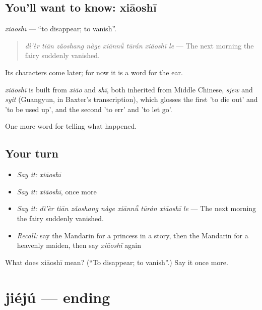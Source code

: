 \subsection*{You'll want to know: xiāoshī}
\emph{xiāoshī} — \textquotedblleft{}to disappear; to vanish\textquotedblright{}.

\begin{quote}
\emph{dì'èr tiān zǎoshang nàge xiānnǚ tūrán xiāoshī le} — The next morning the fairy suddenly vanished.
\end{quote}

Its characters come later; for now it is a word for the ear.

\begin{cousinweb}
\emph{xiāoshī} is built from \emph{xiāo} and \emph{shī}, both inherited from Middle Chinese, \emph{sjew} and \emph{syit} (Guangyun, in Baxter's transcription), which glosses the first 'to die out' and 'to be used up', and the second 'to err' and 'to let go'.
\end{cousinweb}

\begin{grammarlens}[title={What you've built}]
One more word for telling what happened.
\end{grammarlens}

\subsection*{Your turn}
\begin{itemize}
\raggedright
  \item \emph{Say it:} \emph{xiāoshī}
  \item \emph{Say it:} \emph{xiāoshī}, once more
  \item \emph{Say it:} \emph{dì'èr tiān zǎoshang nàge xiānnǚ tūrán xiāoshī le} — The next morning the fairy suddenly vanished.
  \item \emph{Recall:} say the Mandarin for a princess in a story, then the Mandarin for a heavenly maiden, then say \emph{xiāoshī} again
\end{itemize}

\begin{tcolorbox}[breakable,colback=teal!4,colframe=teal!35!black,title={Before you move on}]
What does xiāoshī mean? (\textquotedblleft{}To disappear; to vanish\textquotedblright{}.) Say it once more.
\end{tcolorbox}
\section[jiéjú]{jiéjú — ending}

